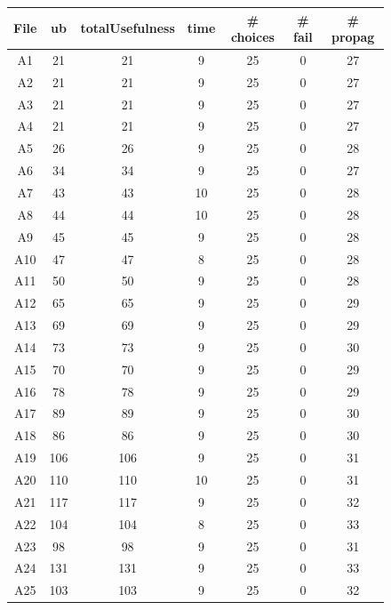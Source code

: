 \documentclass[a4paper ,12pt,french]{article}
\begin{document}
\begin{figure}[!h]
\begin{tabular}{|c|c|c|c|c|c|c|}
\hline
File & ub & totalUsefulness & time & \# choices & \# fail & \# propag\\
\hline
\hline
A1 & 21 & 21 & 9 & 25 & 0 & 27\\
\hline
A2& 21& 21& 9&25&    0& 27\\
\hline
A3& 21& 21& 9&25&    0& 27\\
\hline
A4& 21& 21& 9&25&    0& 27\\
\hline
A5& 26& 26& 9&25&    0& 28\\
\hline
A6& 34& 34& 9&25&    0& 27\\
\hline
A7& 43& 43& 10&25&    0& 28\\
\hline
A8& 44& 44& 10&25&    0& 28\\
\hline
A9& 45& 45& 9&25&    0& 28\\
\hline
A10& 47& 47& 8&25&    0& 28\\
\hline
A11& 50& 50& 9&25&    0& 28\\
\hline
A12& 65& 65& 9&25&    0& 29\\
\hline
A13& 69& 69& 9&25&    0& 29\\
\hline
A14& 73& 73& 9&25&    0& 30\\
\hline
A15& 70& 70& 9&25&    0& 29\\
\hline
A16& 78& 78& 9&25&    0& 29\\
\hline
A17& 89& 89& 9&25&    0& 30\\
\hline
A18& 86& 86& 9&25&    0& 30\\
\hline
A19& 106& 106& 9&25&    0& 31\\
\hline
A20& 110& 110& 10&25&    0& 31\\
\hline
A21& 117& 117& 9&25&    0& 32\\
\hline
A22& 104& 104& 8&25&    0& 33\\
\hline
A23& 98& 98& 9&25&    0& 31\\
\hline
A24& 131& 131& 9&25&    0& 33\\
\hline
A25& 103& 103& 9&25&    0& 32\\
\hline
\end{tabular}
\end{figure}
\end{document}
